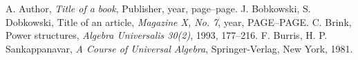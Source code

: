 \documentclass[a4paper,11pt,twoside]{report}
\theoremstyle{definition}
\begin{document}
\thispagestyle{empty}






\begin{thebibliography}{20} %

 A. Author, \emph{Title of a book}, Publisher, year, page--page.
 J. Bobkowski, S. Dobkowski, Title of an article, \emph{Magazine X, No. 7}, year, PAGE--PAGE.
 C. Brink, Power structures, \emph{Algebra Universalis 30(2)}, 1993, 177--216.
 F. Burris, H. P. Sankappanavar, \emph{A Course of Universal Algebra}, Springer-Verlag, New York, 1981.
\end{thebibliography}
\thispagestyle{empty}



\end{document}
